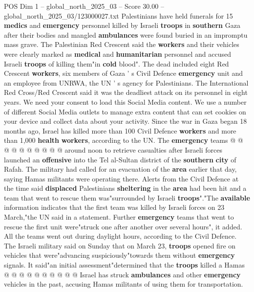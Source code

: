 \begin{textsample}{POS Dim 1 – global\_north\_2025\_03 – Score 30.00 – global\_north\_2025\_03/123000027.txt}  \label{ex:f1_pos_397}
Palestinians have held funerals for 15 \textbf{medics} and \textbf{emergency} personnel killed by Israeli \textbf{troops} in \textbf{southern} Gaza after their bodies and mangled \textbf{ambulances} were found buried in an impromptu mass grave.
The Palestinian Red Crescent said the \textbf{workers} and their vehicles were clearly marked as \textbf{medical} and \textbf{humanitarian} personnel and accused Israeli \textbf{troops} of killing them"in \textbf{cold} blood".
The dead included eight Red Crescent \textbf{workers}, six members of Gaza ' s Civil Defence \textbf{emergency} unit and an employee from UNRWA, the UN ' s agency for Palestinians.
The International Red Cross/Red Crescent said it was the deadliest attack on its personnel in eight years.
We need your consent to load this Social Media content.
We use a number of different Social Media outlets to manage extra content that can set cookies on your device and collect data about your activity.
Since the war in Gaza began 18 months ago, Israel has killed more than 100 Civil Defence \textbf{workers} and more than 1,000 \textbf{health} \textbf{workers}, according to the UN.
The \textbf{emergency} teams @ @ @ @ @ @ @ @ @ @ around noon to retrieve casualties after Israeli forces launched an \textbf{offensive} into the Tel al-Sultan district of the \textbf{southern} \textbf{city} of Rafah.
The military had called for an evacuation of the \textbf{area} earlier that day, saying Hamas militants were operating there.
Alerts from the Civil Defence at the time said \textbf{displaced} Palestinians \textbf{sheltering} in the \textbf{area} had been hit and a team that went to rescue them was"surrounded by Israeli \textbf{troops}"."The \textbf{available} information indicates that the first team was killed by Israeli forces on 23 March,"the UN said in a statement.
Further \textbf{emergency} teams that went to rescue the first unit were"struck one after another over several hours", it added.
All the teams went out during daylight hours, according to the Civil Defence.
The Israeli military said on Sunday that on March 23, \textbf{troops} opened fire on vehicles that were"advancing suspiciously"towards them without \textbf{emergency} signals.
It said"an initial assessment"determined that the \textbf{troops} killed a Hamas @ @ @ @ @ @ @ @ @ @ Israel has struck \textbf{ambulances} and other \textbf{emergency} vehicles in the past, accusing Hamas militants of using them for transportation.

\end{textsample}
